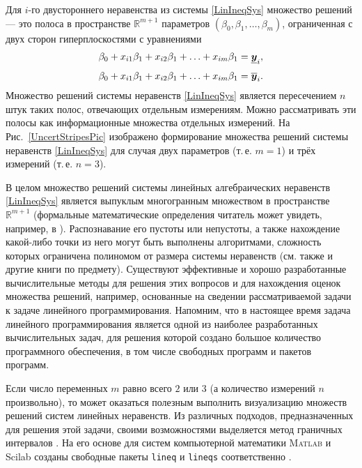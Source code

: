\documentclass[a5paper,openany]{book}
\newcommand{\mbf}[1]{\protect\text{\boldmath$#1$}}
\newcommand{\mbb}{\mathbb}
\newcommand{\ov}{\overline}
\newcommand{\un}{\underline}
\begin{document}
Для $i$-го двустороннего неравенства из системы \eqref{LinIneqSys} множество решений 
--- это полоса в пространстве $\mbb{R}^{m+1}$ параметров $(\beta_0, \beta_1, \ldots,
\beta_m)$, ограниченная с двух сторон гиперплоскостями с уравнениями   
\begin{align*} 
\beta_0 + x_{i1} \beta_1 + x_{i2} \beta_1 + \ldots + x_{im} \beta_1 = \un{\mbf{y}}_{i}, 
\\[3pt] 
\beta_0 + x_{i1} \beta_1 + x_{i2} \beta_1 + \ldots + x_{im} \beta_1 = \ov{\mbf{y}}_{i}. 
\end{align*} 
Множество решений системы неравенств \eqref{LinIneqSys} является пересечением $n$ 
штук таких полос, отвечающих отдельным измерениям. Можно рассматривать эти полосы 
как информационные множества отдельных измерений. На Рис.~\ref{UncertStripesPic} 
изображено формирование множества решений системы неравенств \eqref{LinIneqSys} 
для случая двух параметров (т.\,е. $m = 1$) и трёх измерений (т.\,е. $n = 3$). 
  
В целом множество решений системы линейных алгебраических неравенств \eqref{LinIneqSys} 
является выпуклым многогранным множеством в пространстве $\mbb{R}^{m+1}$ (формальные 
математические определения читатель может увидеть, например, в \cite{Schrijver}). 
Распознавание его пустоты или непустоты, а также нахождение какой-либо точки из него 
могут быть выполнены алгоритмами, сложность которых ограничена полиномом от размера 
системы неравенств (см. также \cite{Schrijver} и другие книги по предмету). Существуют 
эффективные и хорошо разработанные вычислительные методы для решения этих вопросов 
и для нахождения оценок множества решений, например, основанные на сведении 
рассматриваемой задачи к задаче линейного программирования. Напомним, что в настоящее 
время задача линейного программирования является одной из наиболее разработанных 
вычислительных задач, для решения которой создано большое количество программного 
обеспечения, в том числе свободных программ и пакетов программ. 
  
Если число переменных $m$ равно всего $2$ или $3$ (а количество измерений $n$ 
произвольно), то может оказаться полезным выполнить визуализацию множеств решений 
систем линейных неравенств. Из различных подходов, предназначенных для решения этой 
задачи, своими возможностями выделяется метод граничных интервалов \cite{IreneJCT2015, 
IreneRC2014}. На его основе для систем компьютерной математики \textsc{Matlab} и Scilab 
созданы свободные пакеты \texttt{lineq} и \texttt{lineqs} соответственно \cite{lineqs}. 
  
\end{document}
